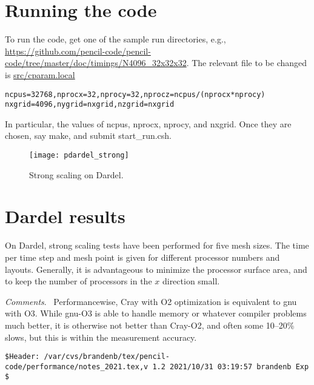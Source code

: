 \documentclass[twocolumn]{article}
\begin{document}
\section{Running the code}

To run the code, get one of the sample run directories, e.g.,
\url{https://github.com/pencil-code/pencil-code/tree/master/doc/timings/N4096_32x32x32}.
The relevant file to be changed is \url{src/cparam.local}
\scriptsize
\begin{verbatim}
ncpus=32768,nprocx=32,nprocy=32,nprocz=ncpus/(nprocx*nprocy)
nxgrid=4096,nygrid=nxgrid,nzgrid=nxgrid
\end{verbatim}
\normalsize
In particular, the values of ncpus, nprocx, nprocy, and nxgrid.
Once they are chosen, say make, and submit
start\_run.csh.

\begin{figure}[h!]\begin{center}
\texttt{[image: pdardel\_strong]}
\end{center}\caption[]{
Strong scaling on Dardel.
}\label{pdardel_strong}\end{figure}

\section{Dardel results}

On Dardel, strong scaling tests have been performed
for five mesh sizes.
The time per time step and mesh point is given for
different processor numbers and layouts.
Generally, it is advantageous to minimize the
processor surface area, and to keep the number
of processors in the $x$ direction small.

{\em Comments}.~
Performancewise, Cray with O2 optimization is equivalent to gnu with O3.
While gnu-O3 is able to handle memory or whatever compiler problems much
better, it is otherwise not better than Cray-O2, and often some 10--20\%
slows, but this is within the measurement accuracy.




\vfill\bigskip\noindent\tiny\begin{verbatim}
$Header: /var/cvs/brandenb/tex/pencil-code/performance/notes_2021.tex,v 1.2 2021/10/31 03:19:57 brandenb Exp $
\end{verbatim}
\end{document}
